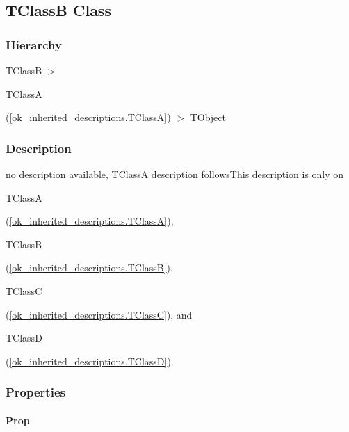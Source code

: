 \documentclass{report}
\begin{document}
\subsection*{TClassB Class}
\subsubsection*{\large{\textbf{Hierarchy}}\normalsize\hspace{1ex}\hfill}
TClassB {$>$} \begin{ttfamily}TClassA\end{ttfamily}(\ref{ok_inherited_descriptions.TClassA}) {$>$} 
TObject
\subsubsection*{\large{\textbf{Description}}\normalsize\hspace{1ex}\hfill}
no description available, TClassA description followsThis description is only on \begin{ttfamily}TClassA\end{ttfamily}(\ref{ok_inherited_descriptions.TClassA}), \begin{ttfamily}TClassB\end{ttfamily}(\ref{ok_inherited_descriptions.TClassB}), \begin{ttfamily}TClassC\end{ttfamily}(\ref{ok_inherited_descriptions.TClassC}), and \begin{ttfamily}TClassD\end{ttfamily}(\ref{ok_inherited_descriptions.TClassD}).\subsubsection*{\large{\textbf{Properties}}\normalsize\hspace{1ex}\hfill}
\paragraph*{Prop}\hspace*{\fill}
\end{document}
